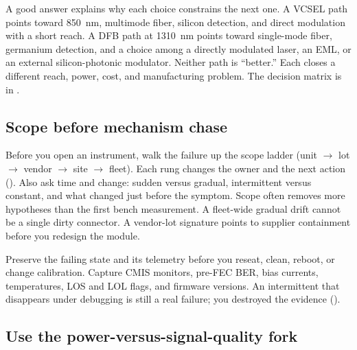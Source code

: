 A good answer explains why each choice constrains the next one. A
VCSEL path points toward 850~nm, multimode
fiber, silicon detection, and direct modulation with a short
reach. A DFB path at 1310~nm points toward single-mode
fiber, germanium detection, and a choice among a directly
modulated laser, an EML, or an external
silicon-photonic modulator. Neither path is ``better.'' Each closes a
different reach, power, cost, and manufacturing problem. The decision matrix
is in .

\subsection{Scope before mechanism chase}

Before you open an instrument, walk the failure up the scope ladder
(unit $\rightarrow$ lot $\rightarrow$ vendor $\rightarrow$ site $\rightarrow$
fleet). Each rung changes the owner and the next action
(). Also ask time and change:
sudden versus gradual, intermittent versus constant, and what changed just
before the symptom. Scope often removes more hypotheses than the first bench
measurement. A fleet-wide gradual drift cannot be a single dirty connector. A
vendor-lot signature points to supplier containment before you redesign the
module.

Preserve the failing state and its telemetry before you reseat, clean,
reboot, or change calibration. Capture CMIS monitors,
\mbox{pre-FEC} BER, bias currents, temperatures,
LOS and LOL flags, and firmware versions. An
intermittent that disappears under debugging is still a real failure; you
destroyed the evidence
().



\subsection{Use the power-versus-signal-quality fork}
\label{sec:interview-power-fork}

